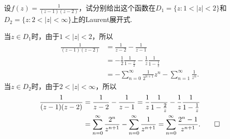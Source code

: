 \begin{example}\label{exam5.1.3}
设$f(z)=\frac1{(z-1)(z-2)}$，试分别给出这个函数在$D_1=\{z:1<|z|<2\}$和$D_2=\{z:2<|z|<\infty\}$上的Laurent展开式.
\end{example}
\begin{solution}
当$z\in D_1$时，由于$1<|z|<2$，所以
\begin{align*}
\frac1{(z-1)(z-2)}&=\frac1{z-2}-\frac1{z-1}\\
&=-\frac12\frac1{1-\frac z2}-\frac1z\frac1{1-\frac1z}\\
&=-\sum_{n=0}^\infty\frac1{2^{n+1}}z^n-\sum_{n=1}^\infty\frac1{z^n}.
\end{align*}
当$z\in D_2$时，由于$2<|z|<\infty$，所以
\begin{align*}
  \frac1{(z-1)(z-2)} &= \frac1{z-2}-\frac1{z-1}
  = \frac1z \frac1{1-\frac2z} - \frac1z \frac1{1-\frac1z}\\
  & = \sum_{n=0}^\infty\frac{2^n}{z^{n+1}} - \sum_{n=0}^\infty\frac1{z^{n+1}}
  =\sum_{n=0}^\infty\frac{2^n-1}{z^{n+1}}. \qedhere
\end{align*}
\end{solution}

